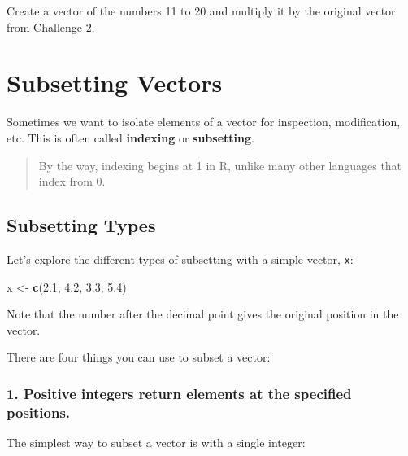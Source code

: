\documentclass[
]{book}
\newenvironment{Shaded}{\begin{snugshade}}{\end{snugshade}}
\newcommand{\FloatTok}[1]{\textcolor[rgb]{0.00,0.00,0.81}{#1}}
\newcommand{\KeywordTok}[1]{\textcolor[rgb]{0.13,0.29,0.53}{\textbf{#1}}}
\newcommand{\NormalTok}[1]{#1}
\newcommand{\StringTok}[1]{\textcolor[rgb]{0.31,0.60,0.02}{#1}}
\begin{document}
Create a vector of the numbers 11 to 20 and multiply it by the original vector from Challenge 2.

\hypertarget{subsetting-vectors}{%
\section{Subsetting Vectors}\label{subsetting-vectors}}

Sometimes we want to isolate elements of a vector for inspection, modification, etc. This is often called \textbf{indexing} or \textbf{subsetting}.

\begin{quote}
By the way, indexing begins at 1 in R, unlike many other languages that index from 0.
\end{quote}

\hypertarget{subsetting-types}{%
\subsection{Subsetting Types}\label{subsetting-types}}

Let's explore the different types of subsetting with a simple vector, \texttt{x}:

\begin{Shaded}
\begin{Highlighting}[]
\NormalTok{x <-}\StringTok{ }\KeywordTok{c}\NormalTok{(}\FloatTok{2.1}\NormalTok{, }\FloatTok{4.2}\NormalTok{, }\FloatTok{3.3}\NormalTok{, }\FloatTok{5.4}\NormalTok{)}
\end{Highlighting}
\end{Shaded}

Note that the number after the decimal point gives the original position in the vector.

There are four things you can use to subset a vector:

\hypertarget{positive-integers-return-elements-at-the-specified-positions.}{%
\subsubsection*{\texorpdfstring{1. \textbf{Positive integers} return elements at the specified positions.}{1. Positive integers return elements at the specified positions.}}\label{positive-integers-return-elements-at-the-specified-positions.}}

The simplest way to subset a vector is with a single integer:
\end{document}
